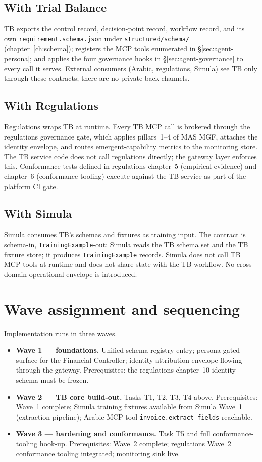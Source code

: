 \subsection{With Trial Balance}
TB exports the control record, decision-point record, workflow
record, and its own \texttt{requirement.schema.json} under
\texttt{structured/schema/} (chapter~\ref{ch:schema}); registers the
MCP tools enumerated in \S\ref{sec:agent-persona}; and applies the
four governance hooks in \S\ref{sec:agent-governance} to every call
it serves. External consumers (Arabic, regulations, Simula) see TB
only through these contracts; there are no private back-channels.

\subsection{With Regulations}
Regulations wraps TB at runtime. Every TB MCP call is brokered
through the regulations governance gate, which applies pillars~1--4
of MAS MGF, attaches the identity envelope, and routes
emergent-capability metrics to the monitoring store. The TB service
code does not call regulations directly; the gateway layer enforces
this. Conformance tests defined in regulations chapter~5 (empirical
evidence) and chapter~6 (conformance tooling) execute against the TB
service as part of the platform CI gate.

\subsection{With Simula}
Simula consumes TB's schemas and fixtures as training input. The
contract is schema-in, \texttt{TrainingExample}-out: Simula reads the
TB schema set and the TB fixture store; it produces
\texttt{TrainingExample} records. Simula does not call TB MCP tools
at runtime and does not share state with the TB workflow. No
cross-domain operational envelope is introduced.

\section{Wave assignment and sequencing}
\label{sec:agent-waves}
Implementation runs in three waves.

\begin{itemize}
  \item \textbf{Wave 1 --- foundations.} Unified schema registry
    entry; persona-gated surface for the Financial Controller;
    identity attribution envelope flowing through the gateway.
    Prerequisites: the regulations chapter~10 identity schema must
    be frozen.
  \item \textbf{Wave 2 --- TB core build-out.} Tasks T1, T2, T3, T4
    above. Prerequisites: Wave~1 complete; Simula training fixtures
    available from Simula Wave~1 (extraction pipeline); Arabic MCP
    tool \texttt{invoice.extract-fields} reachable.
  \item \textbf{Wave 3 --- hardening and conformance.} Task T5 and
    full conformance-tooling hook-up. Prerequisites: Wave~2 complete;
    regulations Wave~2 conformance tooling integrated; monitoring
    sink live.
\end{itemize}

